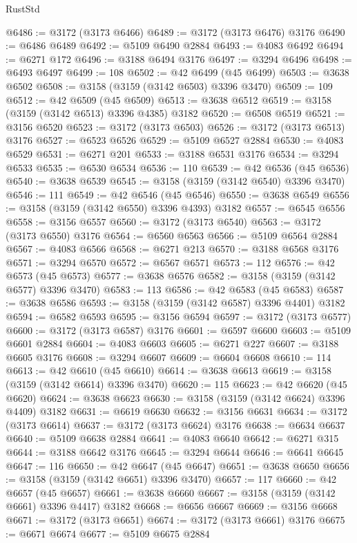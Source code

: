 \begin{lexlean}{RustStd}
\begin{coremodule}
@6486 := @3172 (@3173 @6466)
@6489 := @3172 (@3173 @6476) @3176
@6490 := @6486 @6489
@6492 := @5109 @6490 @2884
@6493 := @4083 @6492
@6494 := @6271 @172
@6496 := @3188 @6494 @3176
@6497 := @3294 @6496
@6498 := @6493 @6497
@6499 := 108
@6502 := @42 @6499 (@45 @6499)
@6503 := @3638 @6502
@6508 := @3158 (@3159 (@3142 @6503) @3396 @3470)
@6509 := 109
@6512 := @42 @6509 (@45 @6509)
@6513 := @3638 @6512
@6519 := @3158 (@3159 (@3142 @6513) @3396 @4385) @3182
@6520 := @6508 @6519
@6521 := @3156 @6520
@6523 := @3172 (@3173 @6503)
@6526 := @3172 (@3173 @6513) @3176
@6527 := @6523 @6526
@6529 := @5109 @6527 @2884
@6530 := @4083 @6529
@6531 := @6271 @201
@6533 := @3188 @6531 @3176
@6534 := @3294 @6533
@6535 := @6530 @6534
@6536 := 110
@6539 := @42 @6536 (@45 @6536)
@6540 := @3638 @6539
@6545 := @3158 (@3159 (@3142 @6540) @3396 @3470)
@6546 := 111
@6549 := @42 @6546 (@45 @6546)
@6550 := @3638 @6549
@6556 := @3158 (@3159 (@3142 @6550) @3396 @4393) @3182
@6557 := @6545 @6556
@6558 := @3156 @6557
@6560 := @3172 (@3173 @6540)
@6563 := @3172 (@3173 @6550) @3176
@6564 := @6560 @6563
@6566 := @5109 @6564 @2884
@6567 := @4083 @6566
@6568 := @6271 @213
@6570 := @3188 @6568 @3176
@6571 := @3294 @6570
@6572 := @6567 @6571
@6573 := 112
@6576 := @42 @6573 (@45 @6573)
@6577 := @3638 @6576
@6582 := @3158 (@3159 (@3142 @6577) @3396 @3470)
@6583 := 113
@6586 := @42 @6583 (@45 @6583)
@6587 := @3638 @6586
@6593 := @3158 (@3159 (@3142 @6587) @3396 @4401) @3182
@6594 := @6582 @6593
@6595 := @3156 @6594
@6597 := @3172 (@3173 @6577)
@6600 := @3172 (@3173 @6587) @3176
@6601 := @6597 @6600
@6603 := @5109 @6601 @2884
@6604 := @4083 @6603
@6605 := @6271 @227
@6607 := @3188 @6605 @3176
@6608 := @3294 @6607
@6609 := @6604 @6608
@6610 := 114
@6613 := @42 @6610 (@45 @6610)
@6614 := @3638 @6613
@6619 := @3158 (@3159 (@3142 @6614) @3396 @3470)
@6620 := 115
@6623 := @42 @6620 (@45 @6620)
@6624 := @3638 @6623
@6630 := @3158 (@3159 (@3142 @6624) @3396 @4409) @3182
@6631 := @6619 @6630
@6632 := @3156 @6631
@6634 := @3172 (@3173 @6614)
@6637 := @3172 (@3173 @6624) @3176
@6638 := @6634 @6637
@6640 := @5109 @6638 @2884
@6641 := @4083 @6640
@6642 := @6271 @315
@6644 := @3188 @6642 @3176
@6645 := @3294 @6644
@6646 := @6641 @6645
@6647 := 116
@6650 := @42 @6647 (@45 @6647)
@6651 := @3638 @6650
@6656 := @3158 (@3159 (@3142 @6651) @3396 @3470)
@6657 := 117
@6660 := @42 @6657 (@45 @6657)
@6661 := @3638 @6660
@6667 := @3158 (@3159 (@3142 @6661) @3396 @4417) @3182
@6668 := @6656 @6667
@6669 := @3156 @6668
@6671 := @3172 (@3173 @6651)
@6674 := @3172 (@3173 @6661) @3176
@6675 := @6671 @6674
@6677 := @5109 @6675 @2884

\end{coremodule}
\end{lexlean}
